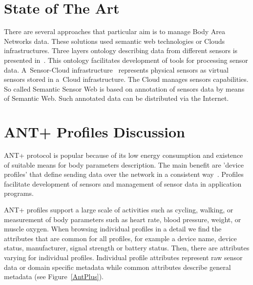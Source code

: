 \documentclass[conference]{IEEEtran}
\begin{document}
\section{State of The Art}\label{sec:state-of-the-art}

There are several approaches that particular aim is to manage Body Area Networks data. These solutions used semantic web technologies or Clouds infrastructures. 
Three layers ontology describing data from different sensors is presented in~\cite{mehmood2014ontology}. This ontology facilitates development of tools for processing sensor data. A~Sensor-Cloud infrastructure~\cite{5635688} represents physical sensors as virtual sensors stored in a~Cloud infrastructure. The Cloud manages sensors capabilities. So called Semantic Sensor Web \cite{4557983} is based on annotation of sensors data by means of Semantic Web. Such annotated data can be distributed via the Internet.


\section{ANT+ Profiles Discussion}\label{sec:ant-plus-profiles}
ANT+ protocol is popular because of its low energy consumption and existence of suitable means for body parameters description. The main benefit are 'device profiles' that define sending data over the network in a consistent way~\cite{innovations2013ant}. Profiles facilitate development of sensors and management of sensor data in application programs.

ANT+ profiles support a large scale of activities such as cycling, walking, or measurement of body parameters such as heart rate, blood pressure, weight, or muscle oxygen. When browsing individual profiles in a detail we find the attributes that are common for all profiles, for example a device name, device status, manufacturer, signal strength or battery status. Then, there are attributes varying for individual profiles. Individual profile attributes represent raw sensor data or domain specific metadata while common attributes describe general metadata (see Figure~\ref{AntPlus}).
\end{document}

